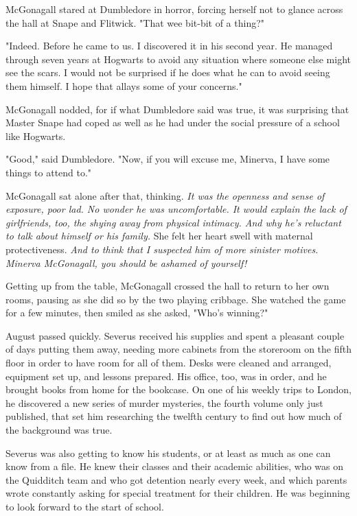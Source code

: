 \documentclass[a4paper,11pt]{article}
\begin{document}
McGonagall stared at Dumbledore in horror, forcing herself not to glance across the hall at Snape and Flitwick. "That wee bit-bit of a thing?"

"Indeed. Before he came to us. I discovered it in his second year. He managed through seven years at Hogwarts to avoid any situation where someone else might see the scars. I would not be surprised if he does what he can to avoid seeing them himself. I hope that allays some of your concerns."

McGonagall nodded, for if what Dumbledore said was true, it was surprising that Master Snape had coped as well as he had under the social pressure of a school like Hogwarts.

"Good," said Dumbledore. "Now, if you will excuse me, Minerva, I have some things to attend to."

McGonagall sat alone after that, thinking. \emph{It was the openness and sense of exposure, poor lad. No wonder he was uncomfortable. It would explain the lack of girlfriends, too, the shying away from physical intimacy. And why he's reluctant to talk about himself or his family.} She felt her heart swell with maternal protectiveness. \emph{And to think that I suspected him of more sinister motives. Minerva McGonagall, you should be ashamed of yourself!}

Getting up from the table, McGonagall crossed the hall to return to her own rooms, pausing as she did so by the two playing cribbage. She watched the game for a few minutes, then smiled as she asked, "Who's winning?"

August passed quickly. Severus received his supplies and spent a pleasant couple of days putting them away, needing more cabinets from the storeroom on the fifth floor in order to have room for all of them. Desks were cleaned and arranged, equipment set up, and lessons prepared. His office, too, was in order, and he brought books from home for the bookcase. On one of his weekly trips to London, he discovered a new series of murder mysteries, the fourth volume only just published, that set him researching the twelfth century to find out how much of the background was true.

Severus was also getting to know his students, or at least as much as one can know from a file. He knew their classes and their academic abilities, who was on the Quidditch team and who got detention nearly every week, and which parents wrote constantly asking for special treatment for their children. He was beginning to look forward to the start of school.
\end{document}
